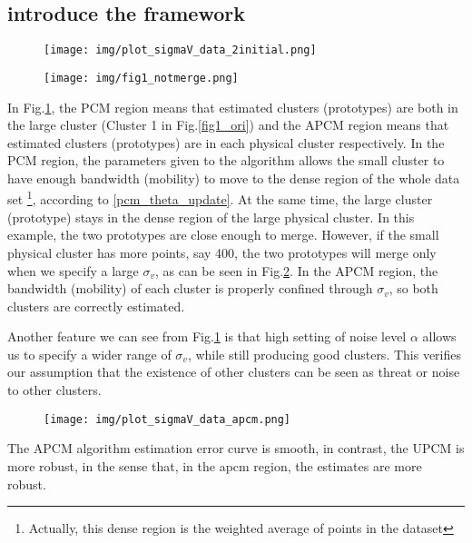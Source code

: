 \documentclass[journal]{IEEEtran}
\begin{document}
\subsection{introduce the framework}
\label{sec-3-2}
\begin{figure}[htb]
\centering
\texttt{[image: img/plot\_sigmaV\_data\_2initial.png]}
\label{fig_transition_apcm_pcm}
\end{figure}

\begin{figure}[htb]
\centering
\texttt{[image: img/fig1\_notmerge.png]}
\label{fig1_notmerge}
\end{figure}


In Fig.\ref{fig_transition_apcm_pcm}, the PCM region means that estimated clusters (prototypes) are both in the large cluster (Cluster 1 in Fig.\ref{fig1_ori}) and the APCM region means that estimated clusters (prototypes) are in each physical cluster respectively.
In the PCM region, the parameters given to the algorithm allows the small cluster to have enough bandwidth (mobility) to move to the dense region of the whole data set \footnote{Actually, this dense region is the weighted average of points in the dataset}, according to \ref{pcm_theta_update}. At the same time, the large cluster (prototype) stays in the dense region of the large physical cluster. In this example, the two prototypes are close enough to merge. However, if the small physical cluster has more points, say 400, the two prototypes will merge only when we specify a large $\sigma_v$, as can be seen in Fig.\ref{fig1_notmerge}.
In the APCM region, the bandwidth (mobility) of each cluster is properly confined through $\sigma_v$, so both clusters are correctly estimated.

Another feature we can see from Fig.\ref{fig_transition_apcm_pcm} is that high setting of noise level $\alpha$ allows us to specify a wider range of  $\sigma_v$, while still producing good clusters. This verifies our assumption that the existence of other clusters can be seen as threat or noise to other clusters. 

\begin{figure}[htb]
\centering
\texttt{[image: img/plot\_sigmaV\_data\_apcm.png]}
\label{fig_apcm_estimation_error}
\end{figure}
The APCM algorithm estimation error curve is smooth, in contrast, the UPCM is more robust, in the sense that, in the apcm region, the estimates are more robust.
\end{document}
